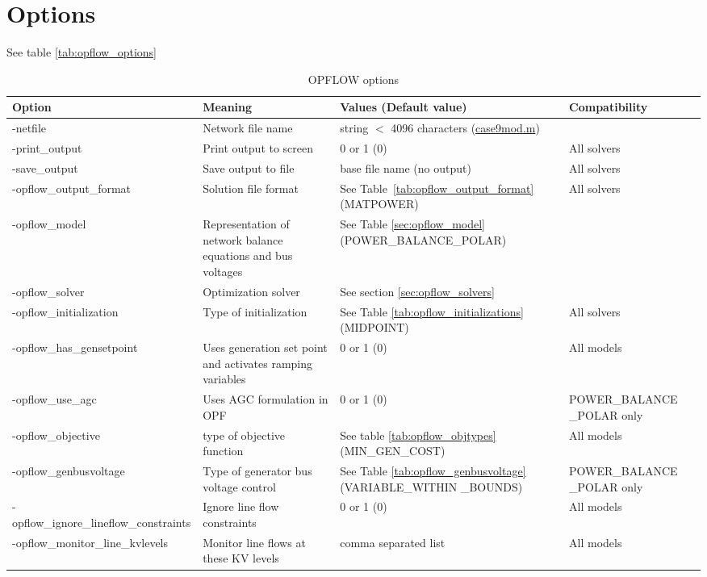 \section{Options}
See table \ref{tab:opflow_options}
\begin{table}[H]
  \caption{OPFLOW options}
  \small
  \begin{tabular}{|p{}|p{}|p{}|p{}|}
    \hline
    \textbf{Option} & \textbf{Meaning} & \textbf{Values (Default value)} & \textbf{Compatibility}\\ \hline
    -netfile & Network file name & string $<$ 4096 characters (\href{https://github.com/ORNL/ExaGO/tree/develop/datafiles/case9/case9mod.m}{case9mod.m}) & \\ \hline
    -print\_output & Print output to screen & 0 or 1 (0) & All solvers\\ \hline
    -save\_output & Save output to file & base file name (no output) & All solvers \\ \hline
    -opflow\_output\_format & Solution file format & See Table~\ref{tab:opflow_output_format} (MATPOWER) & All solvers \\ \hline
    -opflow\_model & Representation of network balance equations and bus voltages & See Table \ref{sec:opflow_model} (POWER\_BALANCE\_POLAR) & \\ \hline
    -opflow\_solver & Optimization solver & See section \ref{sec:opflow_solvers} & \\ \hline
    -opflow\_initialization & Type of initialization & See Table \ref{tab:opflow_initializations} (MIDPOINT) & All solvers \\ \hline
    -opflow\_has\_gensetpoint & Uses generation set point and activates ramping variables & 0 or 1 (0) & All models\\ \hline
    -opflow\_use\_agc & Uses AGC formulation in OPF & 0 or 1 (0) & POWER\_BALANCE \_POLAR only \\ \hline
    -opflow\_objective & type of objective function & See table \ref{tab:opflow_objtypes} (MIN\_GEN\_COST) & All models\\ \hline
    -opflow\_genbusvoltage & Type of generator bus voltage control & See Table \ref{tab:opflow_genbusvoltage} (VARIABLE\_WITHIN \_BOUNDS) & POWER\_BALANCE \_POLAR only \\ \hline
    -opflow\_ignore\_lineflow\_constraints & Ignore line flow constraints & 0 or 1 (0) & All models \\ \hline
    -opflow\_monitor\_line\_kvlevels & Monitor line flows at these KV levels & comma separated list & All models \\ \hline

\end{tabular}
\end{table}
